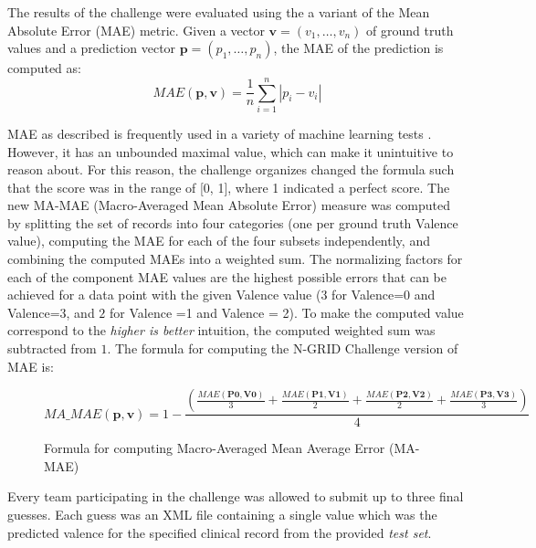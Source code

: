 The results of the challenge were evaluated using the a variant of the \textsf{Mean Absolute Error (MAE)} metric.  Given a vector $\mathbf{v} = (v_1,\ldots,v_n)$ of ground truth values and a prediction vector $\mathbf{p} = (p_1,\ldots, p_n)$, the \textsf{MAE} of the prediction is computed as: $$ MAE(\mathbf{p},\mathbf{v}) = \frac{1}{n}\sum_{i=1}^{n}| p_i - v_i|$$

\textsf{MAE} as described is frequently used in a variety of machine learning tests \cite{willmott2005advantages}. However, it has an unbounded maximal value, which can make it unintuitive to reason about. For this reason, the challenge organizes changed the formula such that the score was in the range of [0, 1], where 1 indicated a perfect score. The new \textsf{MA-MAE} (\textsf{Macro-Averaged Mean Absolute Error}) measure was computed
by splitting the set of records into four categories (one per ground truth \textsf{Valence} value), computing the \textsf{MAE} for each of the four subsets independently, and combining the computed \textsf{MAE}s into a weighted sum. The normalizing factors
for each of the component \textsf{MAE} values are the highest possible errors that
can be achieved for a data point with the given \textsf{Valence} value
($3$ for \textsf{Valence=0} and \textsf{Valence=3}, and $2$ for
\textsf{Valence =1} and \textsf{Valence = 2}).
To make the computed value correspond to the
\textit{higher is better} intuition, the computed weighted sum was subtracted from $1$.
The formula for computing the N-GRID Challenge version of \textsf{MAE} is:

\begin{figure}[H]
$$ MA\_MAE(\mathbf{p},\mathbf{v}) = 1 - 
    \frac{(\frac{MAE(\mathbf{P0}, \mathbf{V0})}{3} + 
     \frac{MAE(\mathbf{P1}, \mathbf{V1})}{2} + 
     \frac{MAE(\mathbf{P2}, \mathbf{V2})}{2} + 
     \frac{MAE(\mathbf{P3}, \mathbf{V3})}{3})}{4} $$
 \caption{Formula for computing Macro-Averaged Mean Average Error (MA-MAE)}
 \end{figure}


Every team participating in the challenge was allowed to submit up to three final guesses. Each guess was an XML file containing a single value which was the predicted valence for the specified clinical record from the provided \textit{test set}.
